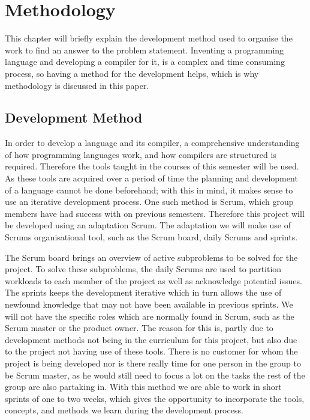 \chapter{Methodology}\label{chap:methdology}

This chapter will briefly explain the development method used to organise the work to find an answer to the problem statement. 
Inventing a programming language and developing a compiler for it, is a complex and time consuming process, so having a method for the development helps, which is why methodology is discussed in this paper.

\section{Development Method}
In order to develop a language and its compiler, a comprehensive understanding of how programming languages work, and how compilers are structured is required.
Therefore the tools taught in the courses of this semester will be used.
As these tools are acquired over a period of time the planning and development of a language cannot be done beforehand; with this in mind, it makes sense to use an iterative development process.
One such method is Scrum, which group members have had success with on previous semesters.
Therefore this project will be developed using an adaptation Scrum.
The adaptation we will make use of Scrums organisational tool, such as the Scrum board, daily Scrums and sprints.

The Scrum board brings an overview of active subproblems to be solved for the project.
To solve these subproblems, the daily Scrums are used to partition workloads to each member of the project as well as acknowledge potential issues.
The sprints keeps the development iterative which in turn allows the use of newfound knowledge that may not have been available in previous sprints.
We will not have the specific roles which are normally found in Scrum, such as the Scrum master or the product owner. \citep{Scrum}
The reason for this is, partly due to development methods not being in the curriculum for this project, but also due to the project not having use of these tools.
There is no customer for whom the project is being developed nor is there really time for one person in the group to be Scrum master, as he would still need to focus a lot on the tasks the rest of the group are also partaking in.
With this method we are able to work in short sprints of one to two weeks, which gives the opportunity to incorporate the tools, concepts, and methods we learn during the development process.

